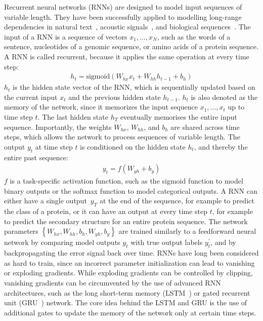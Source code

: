 Recurrent neural networks (RNNs) are designed to model input sequences of variable length. They have been successfully applied to modelling long-range dependencies in natural text~\citep{sutskever_sequence_2014,bahdanau_neural_2014,xiong_dynamic_2016}, acoustic signals~\citep{deng_deep_2015,graves_speech_2013,hinton_deep_2012}, and biological sequences~\citep{agathocleous_protein_2010,sonderby_protein_2014,li_protein_2016,quang_danq:_2016}.  The input of a RNN is a sequence of vectors $x_1,\ldots,x_N$, such as the words of a sentence, nucleotides of a genomic sequence, or amino acids of a protein sequence. A RNN is called recurrent, because it applies the same operation at every time step:
\begin{align}
  h_t=\textrm{sigmoid}(W_{hx}x_t+W_{hh}h_{t-1}+b_h)
\end{align}
$h_t$ is the hidden state vector of the RNN, which is sequentially updated based on the current input $x_t$ and the previous hidden state $h_{t-1}$. $h_t$ is also denoted as the memory of the network, since it memorizes the input sequence $x_1,\ldots,x_t$ up to time step $t$. The last hidden state $h_T$ eventually memorises the entire input sequence. Importantly, the weights $W_{hx}$, $W_{hh}$, and $b_h$ are shared across time steps, which allows the network to process sequences of variable length. The output $y_t$ at time step $t$ is conditioned on the hidden state $h_t$, and thereby the entire past sequence:
\begin{align}
  y_t=f(W_{yh}+b_y)
\end{align}
$f$ is a task-specific activation function, such as the sigmoid function to model binary outputs or the softmax function to model categorical outputs. A RNN can either have a single output~$y_T$ at the end of the sequence, for example to predict the class of a protein, or it can have an output at every time step $t$, for example to predict the secondary structure for an entire protein sequence. The network parameters $\left\{W_{hx},W_{hh},b_h,W_{yh},b_y\right\}$ are trained similarly to a feedforward neural network by comparing model outputs $y_t$ with true output labels $y^\prime_t$, and by backpropagating the error signal back over time. RNNs have long been considered as hard to train, since an incorrect parameter initialization can lead to vanishing or exploding gradients. While exploding gradients can be controlled by clipping, vanishing gradients can be circumvented by the use of advanced RNN architectures, such as the long short-term memory (LSTM~\citep{hochreiter_long_1997}) or gated recurrent unit (GRU~\citep{chung_empirical_2014}) network. The core idea behind the LSTM and GRU is the use of additional gates to update the memory of the network only at certain time steps.

